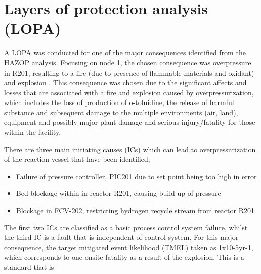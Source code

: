 \section{Layers of protection analysis (LOPA)}

A LOPA was conducted for one of the major consequences identified from the HAZOP analysis. Focusing on node 1, the chosen consequence was overpressure in R201, resulting to a fire (due to presence of flammable materials and oxidant) and explosion . This consequence was chosen due to the significant affects and losses that are associated with a fire and explosion caused by overpressurization, which includes the loss of production of o-toluidine, the release of harmful substance and subsequent damage to the multiple environments (air, land), equipment and possibly major plant damage and serious injury/fatality for those within the facility. 

There are three main initiating causes (ICs) which can lead to overpressurization of the reaction vessel that have been identified;

\begin{itemize}
\item Failure of pressure controller, PIC201 due to set point being too high in error
\item Bed blockage within in reactor R201, causing build up of pressure
\item Blockage in FCV-202, restricting hydrogen recycle stream from reactor R201

\end{itemize}

The first two ICs are classified as a basic process control system failure, whilst the third IC is a fault that is independent of control system. For this major consequence, the target mitigated event likelihood (TMEL) taken as 1x10-5yr-1, which corresponds to one onsite fatality as a result of the explosion. This is a standard that is 

 